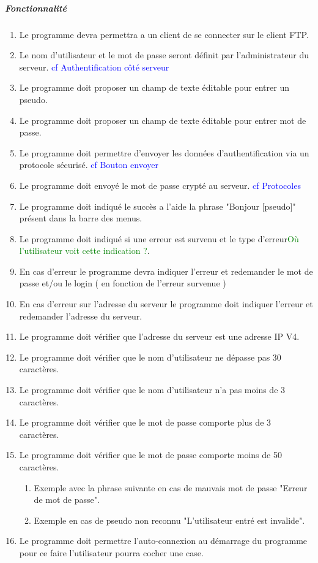\documentclass[10pt,a4paper]{report}
\begin{document}
	\subparagraph{Fonctionnalité}
	\begin{enumerate}
		\item Le programme devra permettra a un client de se connecter sur le client FTP.
		\item Le nom d'utilisateur et le mot de passe seront définit par l'administrateur du serveur. \textcolor{blue}{cf Authentification côté serveur}
		\item Le programme doit proposer un champ de texte éditable pour entrer un pseudo.
		\item Le programme doit proposer un champ de texte éditable pour entrer mot de passe.
		\item Le programme doit permettre d'envoyer les données d'authentification via un protocole sécurisé. \textcolor{blue}{cf Bouton envoyer}
		\item Le programme doit envoyé le mot de passe crypté au serveur. \textcolor{blue}{cf Protocoles}
		\item Le programme doit indiqué le succès a l'aide la phrase "Bonjour [pseudo]" présent dans la barre des menus.
		\item Le programme doit indiqué si une erreur est survenu et le type d'erreur\textcolor{green}{Où l'utilisateur voit cette indication ?}.
		\item En cas d'erreur le programme devra indiquer l'erreur et redemander le mot de passe et/ou le login ( en fonction de l'erreur survenue )
		\item En cas d'erreur sur l'adresse du serveur le programme doit indiquer l'erreur et redemander l'adresse du serveur.
		\item Le programme doit vérifier que l'adresse du serveur est une adresse IP V4.
		\item Le programme doit vérifier que le nom d'utilisateur ne dépasse pas 30 caractères.
		\item Le programme doit vérifier que le nom d'utilisateur n'a pas moins de 3 caractères.
		\item Le programme doit vérifier que le mot de passe comporte plus de 3 caractères.
		\item Le programme doit vérifier que le mot de passe comporte moins de 50 caractères.
		\begin{enumerate}
			\item Exemple avec la phrase suivante en cas de mauvais mot de passe "Erreur de mot de passe".
			\item Exemple en cas de pseudo non reconnu "L'utilisateur entré est invalide".
		\end{enumerate}
		\item Le programme doit permettre l'auto-connexion au démarrage du programme pour ce faire l'utilisateur pourra cocher une case.
	
	\end{enumerate}
\end{document}
